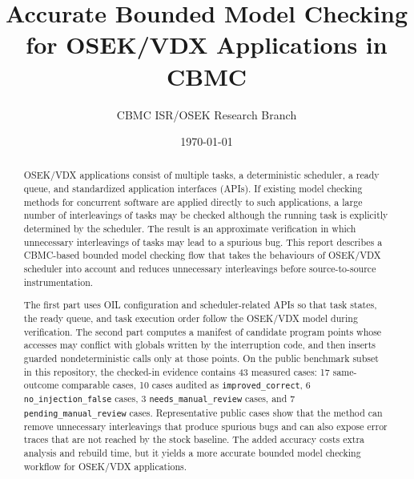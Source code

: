 \documentclass[11pt]{article}
\title{Accurate Bounded Model Checking for OSEK/VDX Applications in CBMC}
\author{CBMC ISR/OSEK Research Branch}
\date{\today}
\begin{document}
\maketitle

\begin{abstract}
OSEK/VDX applications consist of multiple tasks, a deterministic scheduler, a ready queue,
and standardized application interfaces (APIs). If existing model checking methods for
concurrent software are applied directly to such applications, a large number of
interleavings of tasks may be checked although the running task is explicitly determined by
the scheduler. The result is an approximate verification in which unnecessary interleavings
of tasks may lead to a spurious bug. This report describes a CBMC-based bounded model
checking flow that takes the behaviours of OSEK/VDX scheduler into account and reduces
unnecessary interleavings before source-to-source instrumentation.

The first part uses OIL configuration and scheduler-related APIs so that task states, the
ready queue, and task execution order follow the OSEK/VDX model during verification. The
second part computes a manifest of candidate program points whose accesses may conflict with
globals written by the interruption code, and then inserts guarded nondeterministic calls
only at those points. On the public benchmark subset in this repository, the checked-in
evidence contains 43 measured cases: 17 same-outcome comparable cases, 10 cases audited as
\texttt{improved\_correct}, 6 \texttt{no\_injection\_false} cases, 3
\texttt{needs\_manual\_review} cases, and 7 \texttt{pending\_manual\_review} cases.
Representative public cases show that the method can remove unnecessary interleavings that
produce spurious bugs and can also expose error traces that are not reached by the stock
baseline. The added accuracy costs extra analysis and rebuild time, but it yields a more
accurate bounded model checking workflow for OSEK/VDX applications.
\end{abstract}








\appendix


\printbibliography
\end{document}
